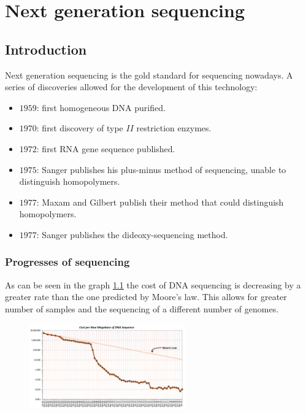 \graphicspath{{chapters/images/03/}}

\chapter{Next generation sequencing}

\section{Introduction}
Next generation sequencing is the gold standard for sequencing nowadays.
A series of discoveries allowed for the development of this technology:

\begin{multicols}{2}
    \begin{itemize}
        \item $1959$: first homogeneous DNA purified.
        \item $1970$: first discovery of type $II$ restriction enzymes.
        \item $1972$: first RNA gene sequence published.
        \item $1975$: Sanger publishes his plus-minus method of sequencing, unable to distinguish homopolymers.
        \item $1977$: Maxam and Gilbert publish their method that could distinguish homopolymers.
        \item $1977$: Sanger publishes the dideoxy-sequencing method.
    \end{itemize}
\end{multicols}

    \subsection{Progresses of sequencing}
    As can be seen in the graph \ref{moore} the cost of DNA sequencing is decreasing by a greater rate than the one predicted by Moore's law.
    This allows for greater number of samples and the sequencing of a different number of genomes.

    \begin{figure}[h]
        \centering
        \includegraphics[width=0.6\textwidth]{sequencingCost}
        \caption{}
        \label{moore}
    \end{figure}

